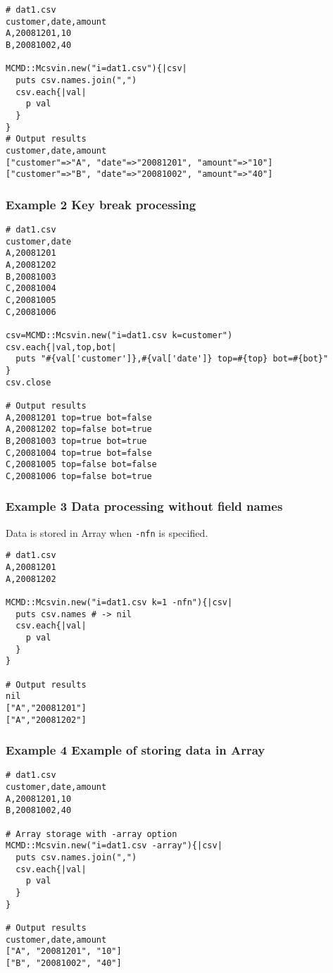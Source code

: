 \begin{Verbatim}[baselinestretch=0.7,frame=single]
# dat1.csv
customer,date,amount
A,20081201,10
B,20081002,40

MCMD::Mcsvin.new("i=dat1.csv"){|csv|
  puts csv.names.join(",")
  csv.each{|val|
    p val
  }
}
# Output results
customer,date,amount
["customer"=>"A", "date"=>"20081201", "amount"=>"10"]
["customer"=>"B", "date"=>"20081002", "amount"=>"40"]
\end{Verbatim}

\subsubsection*{Example 2 Key break processing}

\begin{Verbatim}[baselinestretch=0.7,frame=single]
# dat1.csv
customer,date
A,20081201
A,20081202
B,20081003
C,20081004
C,20081005
C,20081006

csv=MCMD::Mcsvin.new("i=dat1.csv k=customer")
csv.each{|val,top,bot|
  puts "#{val['customer']},#{val['date']} top=#{top} bot=#{bot}"
}
csv.close

# Output results
A,20081201 top=true bot=false
A,20081202 top=false bot=true
B,20081003 top=true bot=true
C,20081004 top=true bot=false
C,20081005 top=false bot=false
C,20081006 top=false bot=true
\end{Verbatim}

\subsubsection*{Example 3 Data processing without field names}
Data is stored in Array when \verb|-nfn| is specified. 
\begin{Verbatim}[baselinestretch=0.7,frame=single]
# dat1.csv
A,20081201
A,20081202

MCMD::Mcsvin.new("i=dat1.csv k=1 -nfn"){|csv|
  puts csv.names # -> nil
  csv.each{|val|
    p val
  }
}

# Output results
nil
["A","20081201"]
["A","20081202"]
\end{Verbatim}

\subsubsection*{Example 4 Example of storing data in Array}

\begin{Verbatim}[baselinestretch=0.7,frame=single]
# dat1.csv
customer,date,amount
A,20081201,10
B,20081002,40

# Array storage with -array option 
MCMD::Mcsvin.new("i=dat1.csv -array"){|csv|
  puts csv.names.join(",")
  csv.each{|val|
    p val
  }
}

# Output results
customer,date,amount
["A", "20081201", "10"]
["B", "20081002", "40"]
\end{Verbatim}

